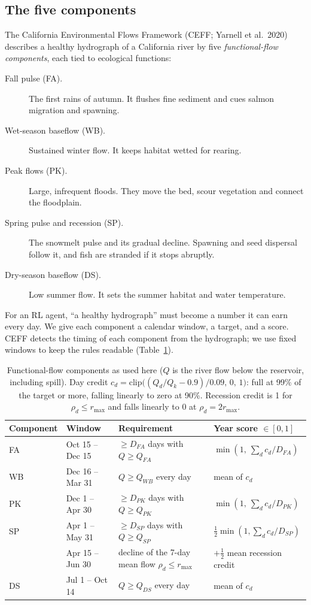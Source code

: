 \documentclass[11pt]{article}
\begin{document}
\subsection{The five components}
The California Environmental Flows Framework (CEFF; Yarnell et al.\ 2020)
describes a healthy hydrograph of a California river by five
\emph{functional-flow components}, each tied to ecological functions:
\begin{description}
\item[Fall pulse (FA).] The first rains of autumn. It flushes fine sediment and
  cues salmon migration and spawning.
\item[Wet-season baseflow (WB).] Sustained winter flow. It keeps habitat wetted
  for rearing.
\item[Peak flows (PK).] Large, infrequent floods. They move the bed, scour
  vegetation and connect the floodplain.
\item[Spring pulse and recession (SP).] The snowmelt pulse and its gradual
  decline. Spawning and seed dispersal follow it, and fish are stranded if it
  stops abruptly.
\item[Dry-season baseflow (DS).] Low summer flow. It sets the summer habitat
  and water temperature.
\end{description}

\noindent For an RL agent, ``a healthy hydrograph'' must become a number it
can earn every day. We give each component a calendar window, a target, and
a score. CEFF detects the timing of each component from the hydrograph; we
use fixed windows to keep the rules readable (Table~\ref{tab:windows}).

\begin{table}[h]
\centering\small
\begin{tabular}{@{}llll@{}}
\toprule
Component & Window & Requirement & Year score $\in[0,1]$\\
\midrule
FA & Oct 15 -- Dec 15 & $\ge D_{FA}$ days with $Q\ge Q_{FA}$ & $\min(1,\ \sum_d c_d/D_{FA})$\\
WB & Dec 16 -- Mar 31 & $Q\ge Q_{WB}$ every day & mean of $c_d$\\
PK & Dec 1 -- Apr 30 & $\ge D_{PK}$ days with $Q\ge Q_{PK}$ & $\min(1,\ \sum_d c_d/D_{PK})$\\
SP & Apr 1 -- May 31 & $\ge D_{SP}$ days with $Q\ge Q_{SP}$ & $\tfrac12\min(1,\sum_d c_d/D_{SP})$\\
   & Apr 15 -- Jun 30 & decline of the 7-day mean flow $\rho_d\le r_{\max}$ & $+\tfrac12$ mean recession credit\\
DS & Jul 1 -- Oct 14 & $Q\ge Q_{DS}$ every day & mean of $c_d$\\
\bottomrule
\end{tabular}
\caption{Functional-flow components as used here ($Q$ is the river flow below
the reservoir, including spill). Day credit
$c_d=\mathrm{clip}\big((Q_d/Q_k-0.9)/0.09,\,0,\,1\big)$: full at 99\% of the
target or more, falling linearly to zero at 90\%. Recession credit is 1 for
$\rho_d\le r_{\max}$ and falls linearly to 0 at $\rho_d=2r_{\max}$.}
\label{tab:windows}
\end{table}
\end{document}
